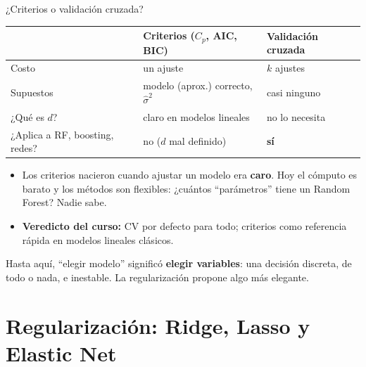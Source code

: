 \documentclass{beamer}
\newcommand{\1}{\mathbb{I}}
\begin{document}
\begin{frame}{¿Criterios o validación cruzada?}
\small
\begin{center}
\footnotesize
\begin{tabular}{lll}
\hline
 & Criterios ($C_p$, AIC, BIC) & Validación cruzada \\
\hline
Costo & un ajuste & $k$ ajustes \\
Supuestos & modelo (aprox.) correcto, $\hat{\sigma}^2$ & casi ninguno \\
¿Qué es $d$? & claro en modelos lineales & no lo necesita \\
¿Aplica a RF, boosting, redes? & no ($d$ mal definido) & \textbf{sí} \\
\hline
\end{tabular}
\end{center}
\pause

\vspace{0.3cm}
\begin{itemize}\itemsep5pt
  \item Los criterios nacieron cuando ajustar un modelo era \textbf{caro}. Hoy el cómputo es barato y los métodos son flexibles: ¿cuántos ``parámetros'' tiene un Random Forest? Nadie sabe.
  \item \textbf{Veredicto del curso:} CV por defecto para todo; criterios como referencia rápida en modelos lineales clásicos.
\end{itemize}
\pause

\vspace{0.2cm}
Hasta aquí, ``elegir modelo'' significó \textbf{elegir variables}: una decisión discreta, de todo o nada, e inestable. La regularización propone algo más elegante.
\end{frame}


\section{Regularización: Ridge, Lasso y Elastic Net}
\begin{frame}[noframenumbering]
\tableofcontents[currentsection]
\end{frame}
\end{document}

